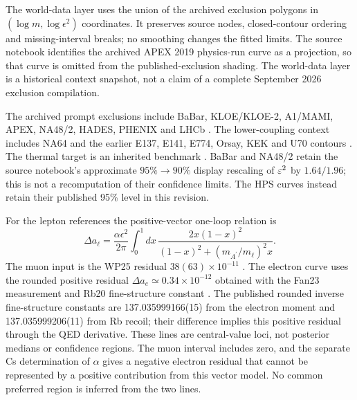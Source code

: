 The world-data layer uses the union of the archived exclusion polygons in
$(\log m,\log\epsilon^2)$ coordinates. It preserves source nodes, closed-contour
ordering and missing-interval breaks; no smoothing changes the fitted limits.
The source notebook identifies the archived APEX 2019 physics-run curve as
a projection, so that curve is omitted from the published-exclusion shading.
The world-data layer is a historical context snapshot, not a claim of a
complete September 2026 exclusion compilation.


The archived prompt exclusions include BaBar, KLOE/KLOE-2, A1/MAMI, APEX,
NA48/2, HADES, PHENIX and LHCb
\cite{BaBarDarkPhoton2014,KLOE2013,KLOE22015,A1MAMI2014,APEX2011,
NA48DarkPhoton2015,HADESDarkPhoton2014,PHENIXDarkPhoton2015,LHCbDarkPhoton2020}.
The lower-coupling context includes NA64 and the earlier E137, E141, E774,
Orsay, KEK and U70 contours
\cite{NA64DarkPhoton2018,NA64X17Visible2021,E137BeamDump1988,
E141BeamDump1987,E774BeamDump1991,OrsayBeamDump1989,KEKBeamDump1986,
U70DarkPhoton2014}. The thermal target is an inherited benchmark
\cite{EssigEtAl2011}. BaBar and NA48/2 retain the source notebook's
approximate $95\%\to90\%$ display rescaling of $\varepsilon^2$ by $1.64/1.96$;
this is not a recomputation of their confidence limits. The HPS curves
instead retain their published 95\% level in this revision.

For the lepton references the positive-vector one-loop relation is
\begin{equation}
 \Delta a_\ell=\frac{\alpha\epsilon^2}{2\pi}
 \int_0^1\!dx\,\frac{2x(1-x)^2}{(1-x)^2+(m_{A^\prime}/m_\ell)^2x}.
\end{equation}
The muon input is the WP25 residual $38(63)\times10^{-11}$
\cite{MuonWP2025}. The electron curve uses the rounded positive residual
$\Delta a_e\simeq0.34\times10^{-12}$ obtained with the Fan23 measurement and
Rb20 fine-structure constant \cite{ElectronFan2023,AlphaMorel2020}.
The published rounded inverse fine-structure constants are
137.035999166(15) from the electron moment and 137.035999206(11) from Rb recoil;
their difference implies this positive residual through the QED derivative.
These lines are central-value loci, not posterior medians or confidence
regions. The muon interval includes zero, and the separate Cs determination
of $\alpha$ gives a negative electron residual that cannot be represented by
a positive contribution from this vector model. No common preferred region
is inferred from the two lines.

